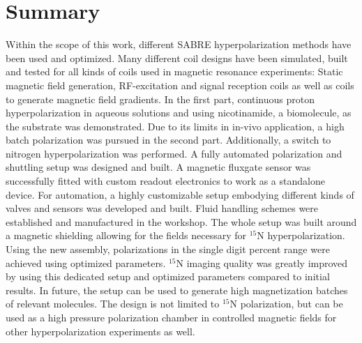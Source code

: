     \section{Summary}
    Within the scope of this work, different SABRE hyperpolarization methods have been used and optimized. Many different coil designs have been simulated, built and tested for all kinds of coils used in magnetic resonance experiments: Static magnetic field generation, RF-excitation and signal reception coils as well as coils to generate magnetic field gradients. In the first part, continuous proton hyperpolarization in aqueous solutions and using nicotinamide, a biomolecule, as the substrate was demonstrated. Due to its limits in in-vivo application, a high batch polarization was pursued in the second part. Additionally, a switch to nitrogen hyperpolarization was performed. A fully automated polarization and shuttling setup was designed and built. A magnetic fluxgate sensor was successfully fitted with custom readout electronics to work as a standalone device. For automation, a highly customizable setup embodying different kinds of valves and sensors was developed and built. Fluid handling schemes were established and manufactured in the workshop. The whole setup was built around a magnetic shielding allowing for the fields necessary for $^{15}$N hyperpolarization. Using the new assembly, polarizations in the single digit percent range were achieved using optimized parameters. $^{15}$N imaging quality was greatly improved by using this dedicated setup and optimized parameters compared to initial results. In future, the setup can be used to generate high magnetization batches of relevant molecules. The design is not limited to $^{15}$N polarization, but can be used as a high pressure polarization chamber in controlled magnetic fields for other hyperpolarization experiments as well.
